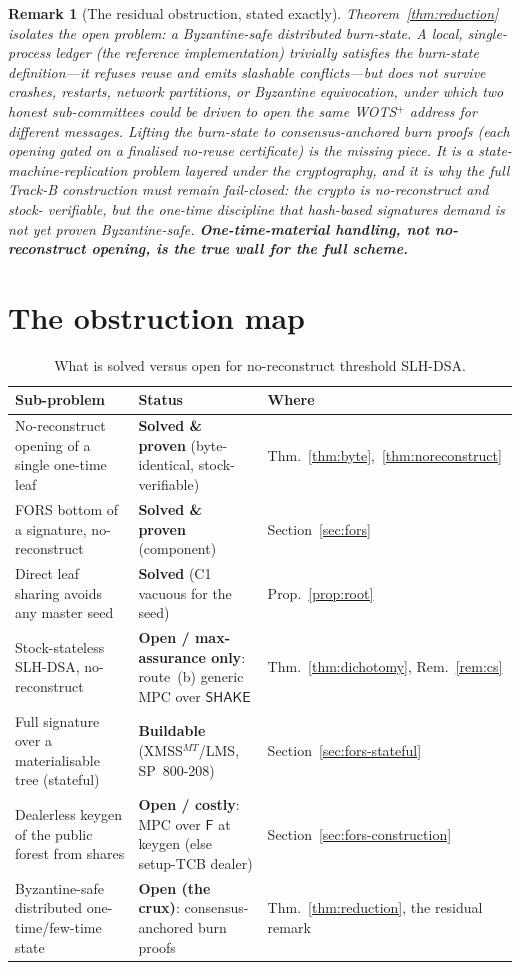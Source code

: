 \documentclass[11pt,a4paper]{article}
\newtheorem{remark}{Remark}
\newcommand{\Fhash}{\mathsf{F}}
\begin{document}
\begin{remark}[The residual obstruction, stated exactly]
Theorem~\ref{thm:reduction} isolates the open problem: a \emph{Byzantine-safe
distributed burn-state}. A local, single-process ledger (the reference
implementation) trivially satisfies the burn-state definition---it refuses reuse and
emits slashable conflicts---but does not survive crashes, restarts, network
partitions, or Byzantine equivocation, under which two honest sub-committees could be
driven to open the same WOTS$^+$ address for different messages. Lifting the
burn-state to consensus-anchored burn proofs (each opening gated on a finalised
no-reuse certificate) is the missing piece. It is a state-machine-replication
problem layered \emph{under} the cryptography, and it is why the full Track-B
construction must remain fail-closed: the crypto is no-reconstruct and stock-
verifiable, but the one-time discipline that hash-based signatures demand is not yet
proven Byzantine-safe. \textbf{One-time-material handling, not no-reconstruct
opening, is the true wall for the full scheme.}
\end{remark}

\section{The obstruction map}
\label{sec:map}

\begin{table}[H]
\centering
\small
\begin{tabularx}{\textwidth}{@{}l X l@{}}
\toprule
\textbf{Sub-problem} & \textbf{Status} & \textbf{Where} \\
\midrule
No-reconstruct opening of a single one-time leaf & \textbf{Solved \& proven} (byte-identical, stock-verifiable) & Thm.~\ref{thm:byte},~\ref{thm:noreconstruct} \\
FORS bottom of a signature, no-reconstruct & \textbf{Solved \& proven} (component) & Section~\ref{sec:fors} \\
Direct leaf sharing avoids any master seed & \textbf{Solved} (C1 vacuous for the seed) & Prop.~\ref{prop:root} \\
Stock-stateless SLH-DSA, no-reconstruct & \textbf{Open / max-assurance only}: route~(b) generic MPC over $\mathsf{SHAKE}$ & Thm.~\ref{thm:dichotomy}, Rem.~\ref{rem:cs} \\
Full signature over a materialisable tree (stateful) & \textbf{Buildable} (XMSS$^{MT}$/LMS, SP~800-208) & Section~\ref{sec:fors-stateful} \\
Dealerless keygen of the public forest from shares & \textbf{Open / costly}: MPC over $\Fhash$ at keygen (else setup-TCB dealer) & Section~\ref{sec:fors-construction} \\
Byzantine-safe distributed one-time/few-time state & \textbf{Open (the crux)}: consensus-anchored burn proofs & Thm.~\ref{thm:reduction}, the residual remark \\
\bottomrule
\end{tabularx}
\caption{What is solved versus open for no-reconstruct threshold SLH-DSA.}
\label{tab:map}
\end{table}
\end{document}
